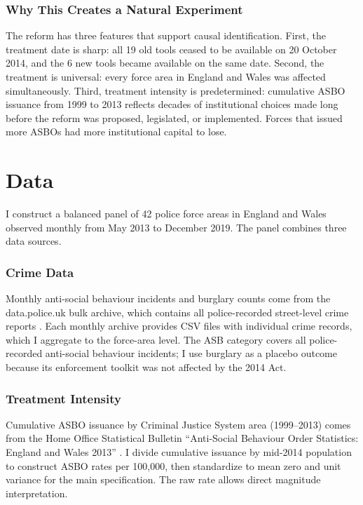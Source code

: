 \documentclass[12pt]{article}
\begin{document}
\subsubsection*{Why This Creates a Natural Experiment} The reform has three features that support causal identification. First, the treatment date is sharp: all 19 old tools ceased to be available on 20 October 2014, and the 6 new tools became available on the same date. Second, the treatment is universal: every force area in England and Wales was affected simultaneously. Third, treatment intensity is predetermined: cumulative ASBO issuance from 1999 to 2013 reflects decades of institutional choices made long before the reform was proposed, legislated, or implemented. Forces that issued more ASBOs had more institutional capital to lose.


\section{Data}

I construct a balanced panel of 42 police force areas in England and Wales observed monthly from May 2013 to December 2019. The panel combines three data sources.

\subsubsection*{Crime Data} Monthly anti-social behaviour incidents and burglary counts come from the data.police.uk bulk archive, which contains all police-recorded street-level crime reports \citep{onscrime2015}. Each monthly archive provides CSV files with individual crime records, which I aggregate to the force-area level. The ASB category covers all police-recorded anti-social behaviour incidents; I use burglary as a placebo outcome because its enforcement toolkit was not affected by the 2014 Act.

\subsubsection*{Treatment Intensity} Cumulative ASBO issuance by Criminal Justice System area (1999--2013) comes from the Home Office Statistical Bulletin ``Anti-Social Behaviour Order Statistics: England and Wales 2013'' \citep{homeoffice2014}. I divide cumulative issuance by mid-2014 population to construct ASBO rates per 100,000, then standardize to mean zero and unit variance for the main specification. The raw rate allows direct magnitude interpretation.
\end{document}
